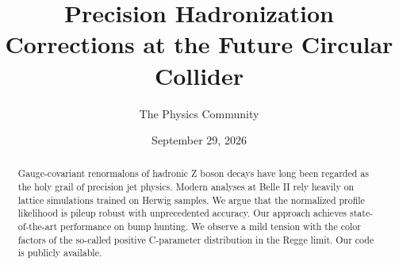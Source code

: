 \documentclass[11pt]{article}
\title{Precision Hadronization Corrections at the Future Circular Collider}
\author{The Physics Community}
\date{September 29, 2026}
\numberwithin{equation}{section}
\theoremstyle{definition}
\theoremstyle{remark}
\begin{document}
\maketitle
\begin{abstract}
Gauge-covariant renormalons of hadronic Z boson decays have long been
regarded as the holy grail of precision jet physics. Modern analyses at
Belle II rely heavily on lattice simulations trained on Herwig samples.
We argue that the normalized profile likelihood is pileup robust with
unprecedented accuracy. Our approach achieves state-of-the-art
performance on bump hunting. We observe a mild tension with the color
factors of the so-called positive C-parameter distribution in the Regge
limit. Our code is publicly available.
\end{abstract}
\tableofcontents



\nocite{*}


\end{document}
